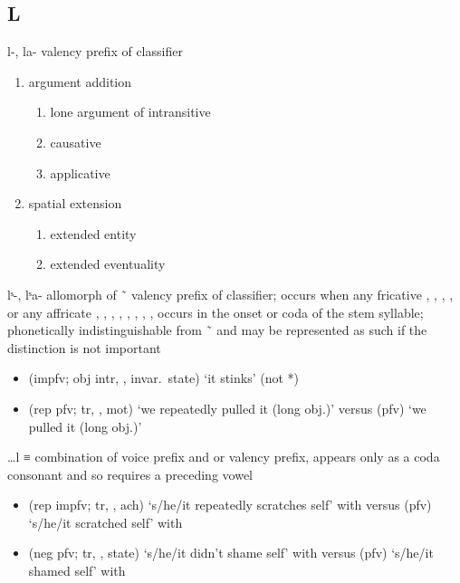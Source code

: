 \documentclass[12pt,letterpaper,oneside,article]{memoir}
\begin{document}
\subsection{L}\label{sec:alphalist-l}
\begin{morphdesc}[resume*=alphalist]
\item[l-, la-]
	valency prefix of classifier
	\begin{enumerate}
	\item	argument addition
		\begin{enumerate}
		\item	lone argument of intransitive
		\item	causative
		\item	applicative
		\end{enumerate}
	\item	spatial extension
		\begin{enumerate}
		\item	extended entity
		\item	extended eventuality
		\end{enumerate}
	\end{enumerate}

\item[lˢ-, lˢa-]
	allomorph of  \~\  valency prefix of classifier;
	occurs when any fricative
		, , , , 
	or any affricate
		, , ,
		, , ,
		, , 
	occurs in the onset or coda of the stem syllable;
	phonetically indistinguishable from  \~\  and may be represented as such
	if the distinction is not important
	\begin{itemize}
	\item	{} (impfv; obj intr, ,  invar.\ state) ‘it stinks’
		(not *)
	\item	{} (rep pfv; tr, , mot) ‘we repeatedly pulled it (long obj.)’\newline
		versus  (pfv) ‘we pulled it (long obj.)’
	\end{itemize}

\item[…l]
	≡ 
	combination of  voice prefix
		and  or  valency prefix,
	appears only as a coda consonant and so requires a preceding vowel
	\begin{itemize}
	\item	{} (rep impfv; tr, , ach) ‘s/he/it repeatedly scratches self’
			with \newline
		versus  (pfv) ‘s/he/it scratched self’
			with 
	\item	{} (neg pfv; tr, ,  state) ‘s/he/it didn’t shame self’
			with 
		versus  (pfv) ‘s/he/it shamed self’
			with 
	\end{itemize}


\end{morphdesc}
\end{document}
